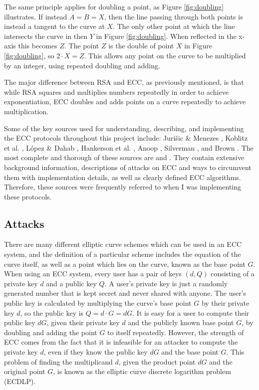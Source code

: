 \documentclass[12pt,a4paper]{article}
\begin{document}
The same principle applies for doubling a point, as Figure \ref{fig:doubling} illustrates. 
If instead $A = B = X$, then the line passing through both points is instead a tangent to the curve at $X$. 
The only other point at which the line intersects the curve in then $Y$ in Figure \ref{fig:doubling}. 
When reflected in the x-axis this becomes $Z$. 
The point $Z$ is the double of point $X$ in Figure \ref{fig:doubling}, so $2 \cdot X = Z$. 
This allows any point on the curve to be multiplied by an integer, using repeated doubling and adding. 

The major difference between RSA and ECC, as previously mentioned, 
is that while RSA squares and multiplies numbers repeatedly in order to achieve exponentiation, 
ECC doubles and adds points on a curve repeatedly to achieve multiplication. 

Some of the key sources used for understanding, describing, and implementing the ECC protocols throughout this project include: 
Juri\v sic \& Menezes \citeyear{jurivsic1997elliptic}, Koblitz et al. \citeyear{koblitz2000state}, L\' opez \& Dahab \citeyear{lopez2000overview}, Hankerson et al. \citeyear{hankerson2003guide}, Anoop \citeyear{anoop2007elliptic}, Silverman \citeyear{silverman2009arithmetic}, and Brown \citeyear{brown2009standards}. 
The most complete and thorough of these sources are \cite{hankerson2003guide} and \cite{silverman2009arithmetic}. 
They contain extensive background information, descriptions of attacks on ECC and ways to circumvent them with implementation details, as well as clearly defined ECC algorithms. 
Therefore, these sources were frequently referred to when I was implementing these protocols. 


\subsection{Attacks} \noindent
There are many different elliptic curve schemes which can be used in an ECC system, 
and the definition of a particular scheme includes the equation of the curve itself, 
as well as a point which lies on the curve, known as the base point $G$. 
When using an ECC system, every user has a pair of keys $(d,Q)$ consisting of a private key $d$ and a public key $Q$. 
A user's private key is just a randomly generated number that is kept secret and never shared with anyone. 
The user's public key is calculated by multiplying the curve's base point $G$ by their private key $d$, so the public key is $Q = d \cdot G = dG$. 
It is easy for a user to compute their public key $dG$, given their private key $d$ and the publicly known base point $G$, 
by doubling and adding the point $G$ to itself repeatedly. 
However, the strength of ECC comes from the fact that it is infeasible for an attacker to compute the private key $d$, even if they know the public key $dG$ and the base point $G$. 
This problem of finding the multiplicand $d$, given the product point $dG$ and the original point $G$, 
is known as the elliptic curve discrete logarithm problem (ECDLP). 
\end{document}
